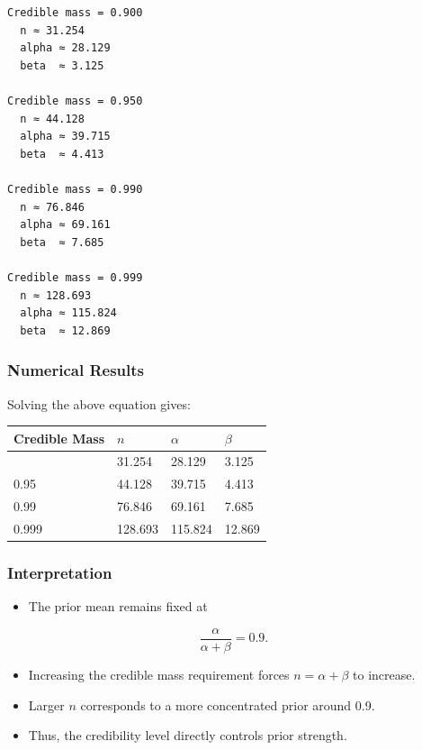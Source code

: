 \documentclass[
  letterpaper,
  DIV=11,
  numbers=noendperiod]{scrartcl}
\providecommand{\tightlist}{%
  \setlength{\itemsep}{0pt}\setlength{\parskip}{0pt}}\usepackage{longtable,booktabs,array}
\begin{document}
\begin{verbatim}
Credible mass = 0.900
  n ≈ 31.254
  alpha ≈ 28.129
  beta  ≈ 3.125

Credible mass = 0.950
  n ≈ 44.128
  alpha ≈ 39.715
  beta  ≈ 4.413

Credible mass = 0.990
  n ≈ 76.846
  alpha ≈ 69.161
  beta  ≈ 7.685

Credible mass = 0.999
  n ≈ 128.693
  alpha ≈ 115.824
  beta  ≈ 12.869
\end{verbatim}

\subsubsection{Numerical Results}\label{numerical-results}

Solving the above equation gives:

\begin{longtable}[]{@{}llll@{}}
\toprule\noalign{}
Credible Mass & \(n\) & \(\alpha\) & \(\beta\) \\
\midrule\noalign{}
\endhead
\bottomrule\noalign{}
\endlastfoot
0.90 & 31.254 & 28.129 & 3.125 \\
0.95 & 44.128 & 39.715 & 4.413 \\
0.99 & 76.846 & 69.161 & 7.685 \\
0.999 & 128.693 & 115.824 & 12.869 \\
\end{longtable}

\subsubsection{Interpretation}\label{interpretation}

\begin{itemize}
\tightlist
\item
  The prior mean remains fixed at
\end{itemize}

\[
\frac{\alpha}{\alpha+\beta} = 0.9.
\]

\begin{itemize}
\tightlist
\item
  Increasing the credible mass requirement forces \(n = \alpha+\beta\)
  to increase.
\item
  Larger \(n\) corresponds to a more concentrated prior around 0.9.
\item
  Thus, the credibility level directly controls prior strength.
\end{itemize}
\end{document}
